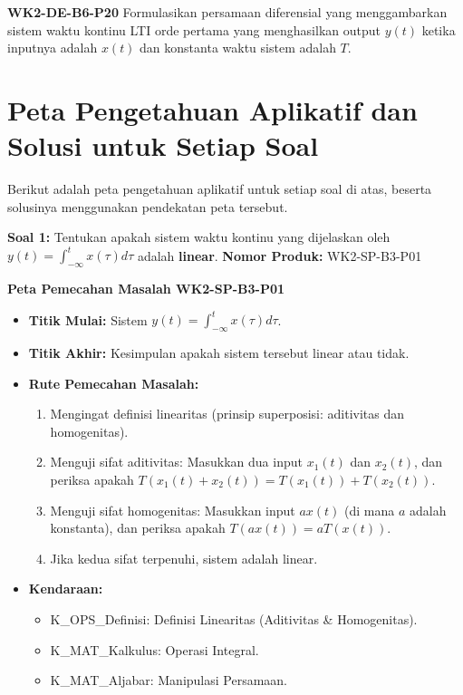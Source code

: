\documentclass[
  letterpaper,
  DIV=11,
  numbers=noendperiod]{scrreprt}
\providecommand{\tightlist}{%
  \setlength{\itemsep}{0pt}\setlength{\parskip}{0pt}}
\begin{document}
\textbf{WK2-DE-B6-P20} Formulasikan persamaan diferensial yang
menggambarkan sistem waktu kontinu LTI orde pertama yang menghasilkan
output \(y(t)\) ketika inputnya adalah \(x(t)\) dan konstanta waktu
sistem adalah \(T\).


\chapter{Peta Pengetahuan Aplikatif dan Solusi untuk Setiap
Soal}\label{peta-pengetahuan-aplikatif-dan-solusi-untuk-setiap-soal}

Berikut adalah peta pengetahuan aplikatif untuk setiap soal di atas,
beserta solusinya menggunakan pendekatan peta tersebut.

\textbf{Soal 1:} Tentukan apakah sistem waktu kontinu yang dijelaskan
oleh \(y(t) = \int_{-\infty}^{t} x(\tau) d\tau\) adalah \textbf{linear}.
\textbf{Nomor Produk:} WK2-SP-B3-P01

\textbf{Peta Pemecahan Masalah WK2-SP-B3-P01}

\begin{itemize}
\tightlist
\item
  \textbf{Titik Mulai:} Sistem
  \(y(t) = \int_{-\infty}^{t} x(\tau) d\tau\).
\item
  \textbf{Titik Akhir:} Kesimpulan apakah sistem tersebut linear atau
  tidak.
\item
  \textbf{Rute Pemecahan Masalah:}

  \begin{enumerate}
  \def\labelenumi{\arabic{enumi}.}
  \tightlist
  \item
    Mengingat definisi linearitas (prinsip superposisi: aditivitas dan
    homogenitas).
  \item
    Menguji sifat aditivitas: Masukkan dua input \(x_1(t)\) dan
    \(x_2(t)\), dan periksa apakah
    \(T(x_1(t)+x_2(t)) = T(x_1(t)) + T(x_2(t))\).
  \item
    Menguji sifat homogenitas: Masukkan input \(ax(t)\) (di mana \(a\)
    adalah konstanta), dan periksa apakah \(T(ax(t)) = aT(x(t))\).
  \item
    Jika kedua sifat terpenuhi, sistem adalah linear.
  \end{enumerate}
\item
  \textbf{Kendaraan:}

  \begin{itemize}
  \tightlist
  \item
    K\_OPS\_Definisi: Definisi Linearitas (Aditivitas \& Homogenitas).
  \item
    K\_MAT\_Kalkulus: Operasi Integral.
  \item
    K\_MAT\_Aljabar: Manipulasi Persamaan.
  \end{itemize}
\end{itemize}
\end{document}
